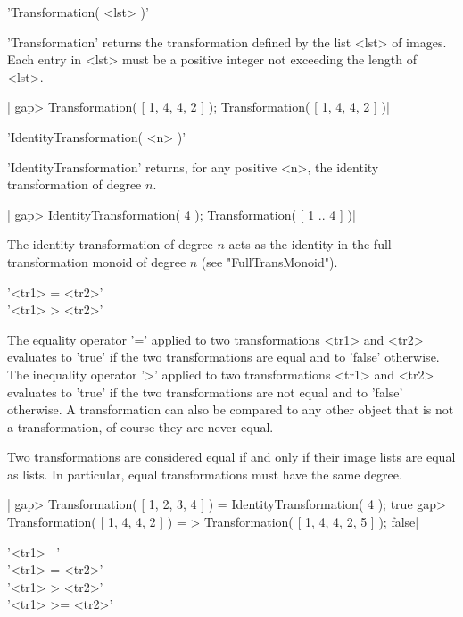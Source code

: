 'Transformation( <lst> )'

'Transformation' returns the transformation  defined by the list <lst> of
images.  Each entry in <lst> must be a positive integer not exceeding the
length of <lst>.

|    gap> Transformation( [ 1, 4, 4, 2 ] );
    Transformation( [ 1, 4, 4, 2 ] )|


'IdentityTransformation( <n> )'

'IdentityTransformation'  returns,  for any  positive  <n>, the  identity
transformation of degree $n$.

|    gap> IdentityTransformation( 4 );
    Transformation( [ 1 .. 4 ] )|

The identity transformation  of degree $n$  acts  as the  identity in the
full transformation monoid of degree $n$ (see "FullTransMonoid").

%
%

'<tr1> = <tr2>'\\
'<tr1> \<> <tr2>'

The equality operator '=' applied to two  transformations <tr1> and <tr2>
evaluates to 'true' if the  two transformations are  equal and to 'false'
otherwise.  The inequality  operator '\<>' applied to two transformations
<tr1> and <tr2> evaluates to  'true' if the  two transformations are  not
equal and to 'false' otherwise.  A transformation can also be compared to
any other object  that is not a  transformation, of course they are never
equal.
    
Two transformations are considered equal if and only if their image lists
are equal  as lists.  In particular,  equal transformations must have the
same degree.

|    gap> Transformation( [ 1, 2, 3, 4 ] ) = IdentityTransformation( 4 );
    true
    gap> Transformation( [ 1, 4, 4, 2 ] ) = 
    > Transformation( [ 1, 4, 4, 2, 5 ] );
    false|

\vspace{5mm}
'<tr1> \<\ <tr2>' \\
'<tr1> \<= <tr2>' \\
'<tr1>  >  <tr2>' \\
'<tr1>  >= <tr2>'


